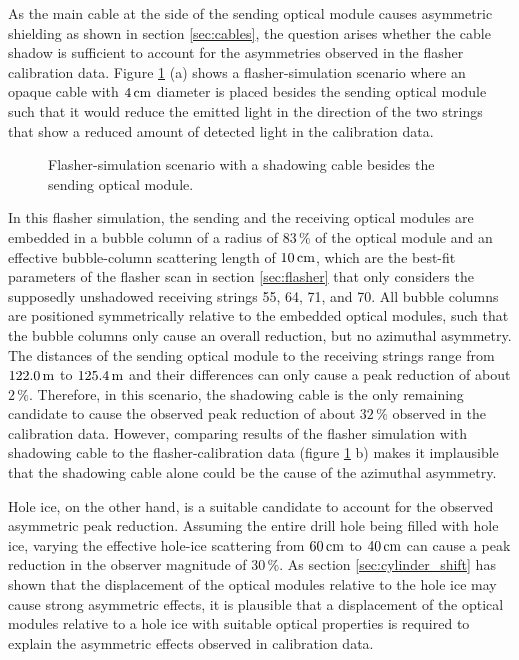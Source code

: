 As the main cable at the side of the sending optical module causes
asymmetric shielding as shown in section \ref{sec:cables}, the question
arises whether the cable shadow is sufficient to account for the
asymmetries observed in the flasher calibration data. Figure
\ref{fig:neen7Noo} (a) shows a flasher-simulation scenario where an
opaque cable with \(4\text{\,cm}\) diameter is placed besides the sending
optical module such that it would reduce the emitted light in the
direction of the two strings that show a reduced amount of detected
light in the calibration data.

\begin{figure}[htbp]
  \hfill
  \caption{Flasher-simulation scenario with a shadowing cable besides the sending optical module.}
  \label{fig:neen7Noo}
\end{figure}


In this flasher simulation, the sending and the receiving optical
modules are embedded in a bubble column of a radius of \(83\,\%\) of the
optical module and an effective bubble-column scattering length of
\(10\text{\,cm}\), which are the best-fit parameters of the flasher scan in
section \ref{sec:flasher} that only considers the supposedly unshadowed
receiving strings 55, 64, 71, and 70. All bubble columns are positioned
symmetrically relative to the embedded optical modules, such that the
bubble columns only cause an overall reduction, but no azimuthal
asymmetry. The distances of the sending optical module to the receiving
strings range from \(122.0\text{\,m}\) to \(125.4\text{\,m}\) and their differences can
only cause a peak reduction of about \(2\,\%\). Therefore, in this
scenario, the shadowing cable is the only remaining candidate to cause
the observed peak reduction of about \(32\,\%\) observed in the
calibration data. However, comparing results of the flasher simulation
with shadowing cable to the flasher-calibration data (figure
\ref{fig:neen7Noo} b) makes it implausible that the shadowing cable
alone could be the cause of the azimuthal asymmetry.

Hole ice, on the other hand, is a suitable candidate to account for the
observed asymmetric peak reduction. Assuming the entire drill hole being
filled with hole ice, varying the effective hole-ice scattering from
\(60\text{\,cm}\) to \(40\text{\,cm}\) can cause a peak reduction in the observer
magnitude of \(30\,\%\). As section \ref{sec:cylinder_shift} has shown
that the displacement of the optical modules relative to the hole ice
may cause strong asymmetric effects, it is plausible that a displacement
of the optical modules relative to a hole ice with suitable optical
properties is required to explain the asymmetric effects observed in
calibration data.
